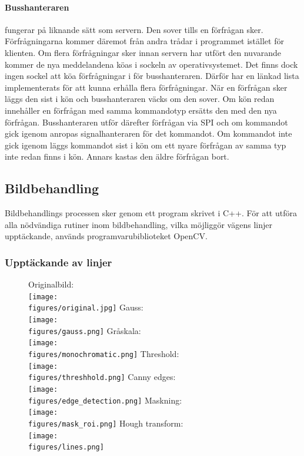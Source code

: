\documentclass[tekniskrapport/tech.tex]{subfiles}
\begin{document}
\paragraph{Busshanteraren} fungerar på liknande sätt som servern. Den sover
tills en förfrågan sker. Förfrågningarna kommer däremot från andra trådar i
programmet istället för klienten. Om flera förfrågningar sker innan servern har
utfört den nuvarande kommer de nya meddelandena köas i sockeln av
operativsystemet. Det finns dock ingen sockel att köa förfrågningar i för
busshanteraren. Därför har en länkad lista implementerats för att kunna erhålla
flera förfrågningar. När en förfrågan sker läggs den sist i kön och
busshanteraren väcks om den sover. Om kön redan innehåller en förfrågan med
samma kommandotyp ersätts den med den nya förfrågan. Busshanteraren utför
därefter förfrågan via SPI och om kommandot gick igenom anropas
signalhanteraren för det kommandot. Om kommandot inte gick igenom läggs
kommandot sist i kön om ett nyare förfrågan av samma typ inte redan finns i
kön. Annars kastas den äldre förfrågan bort.

\subsection{Bildbehandling}
Bildbehandlings processen sker genom ett program skrivet i C++. För att utföra
alla nödvändiga rutiner inom bildbehandling, vilka möjliggör vägens linjer
upptäckande, används programvarubiblioteket OpenCV.

\subsubsection{Upptäckande av linjer}

\begin{figure}
    \vspace*{-8mm}
    Originalbild:\\[1mm]
    \texttt{[image: \\figures/original.jpg]}
    \label{fig:gauss}
    Gauss:\\[1mm]
    \texttt{[image: \\figures/gauss.png]}
    \label{fig:gauss}
    Gråskala:\\[1mm]
    \texttt{[image: \\figures/monochromatic.png]}
    \label{fig:monochromatic}
    Threshold:\\[1mm]
    \texttt{[image: \\figures/threshhold.png]}
    \label{fig:threshhold}
    Canny edges:\\[1mm]
    \texttt{[image: \\figures/edge\_detection.png]}
    \label{fig:edge_det}
    Maskning:\\[1mm]
    \texttt{[image: \\figures/mask\_roi.png]}
    \label{fig:mask}
    Hough transform:\\[1mm]
    \texttt{[image: \\figures/lines.png]}
    \label{fig:lines}
\end{figure}
\end{document}
